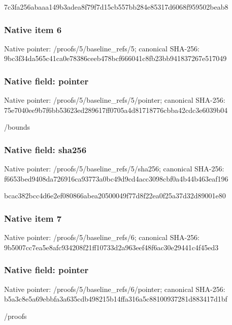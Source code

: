\documentclass[10pt,a4paper]{article}
\begin{document}
\begingroup\raggedright\sloppy 7c3fa256abaaa149b3adea8f79f7d15cb557bb284e85317d6068f959502beab8\par\endgroup

\subsubsection{Native item 6}
Native pointer: /proofs/5/baseline\_\allowbreak{}refs/5; canonical SHA-256: 9bc3f34da565c41ca0e78386ceeb478bcf666041c8fb23bb941837267e517049

\subsubsection{Native field: pointer}
Native pointer: /proofs/5/baseline\_\allowbreak{}refs/5/pointer; canonical SHA-256: 75e7040ee9b7f6bb53623ed289617ff0705a4d81718776cbba42cdc3e6039b04

\begingroup\raggedright\sloppy /\allowbreak{}bounds\par\endgroup

\subsubsection{Native field: sha256}
Native pointer: /proofs/5/baseline\_\allowbreak{}refs/5/sha256; canonical SHA-256: f6653bed9408da726916ca93773a0bc49d9cd4acc3098cbf0a4b44b463eaf196

\begingroup\raggedright\sloppy bcac382bcc4d6e2ef080866abea20500049f77d8f22ea0f25a37d32d89001e80\par\endgroup

\subsubsection{Native item 7}
Native pointer: /proofs/5/baseline\_\allowbreak{}refs/6; canonical SHA-256: 9b5007cc7ea5e8afc934208f21ff10733d2a963eef48f6ac30e29441c4f45ed3

\subsubsection{Native field: pointer}
Native pointer: /proofs/5/baseline\_\allowbreak{}refs/6/pointer; canonical SHA-256: b5a3c8e5a69ebbfa3a635cdb498215b14ffa316a5c88100937281d883417d1bf

\begingroup\raggedright\sloppy /\allowbreak{}proofs\par\endgroup
\end{document}

